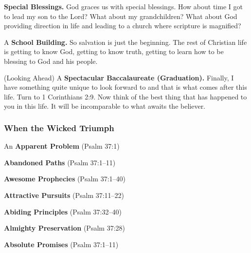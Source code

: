 \begin{compactenum}[I.][19]
    \item \textbf{Special Blessings.} God graces us with special blessings. How about time I got to lead my son to the Lord? What about my grandchildren? What about God providing direction in life and leading to a church where scripture is magnified?  %
    \item A \textbf{School Building.} So salvation is just the beginning.  The rest of Christian life is getting to know God, getting to know truth, getting to learn how to be blessing to God and his people. %
    \item (Looking Ahead) A \textbf{Spectacular Baccalaureate (Graduation).} Finally, I have something quite unique to look forward to and that is what comes after this life. Turn to 1 Corinthians 2:9. Now think of the best thing that has happened to you in this life.  It will be incomparable to what awaits the believer. %
\end{compactenum}


\subsubsection{When the Wicked Triumph}


\begin{compactenum}[I.][19]
    \item An \textbf{Apparent Problem} (Psalm 37:1) 
    \item \textbf{Abandoned Paths} (Psalm 37:1--11)
    \item \textbf{Awesome Prophecies} (Psalm 37:1--40)
    \item \textbf{Attractive Pursuits} (Psalm 37:11--22)
    \item \textbf{Abiding Principles} (Psalm 37:32--40)
    \item \textbf{Almighty Preservation} (Psalm 37:28)
    \item \textbf{Absolute Promises} (Psalm 37:1--11)
\end{compactenum}

